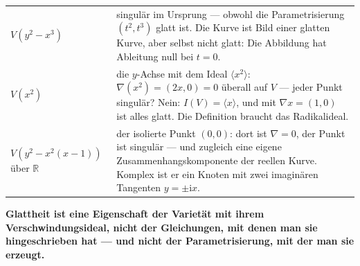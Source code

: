 \begin{warnung}
\begin{center}
{\small
\renewcommand{\arraystretch}{1.5}
\begin{tabular}{@{}P{3.2cm}P{5.6cm}@{}}
\toprule
$V(y^{2} - x^{3})$ & singulär im Ursprung --- obwohl die Parametrisierung $(t^{2}, t^{3})$ glatt ist. Die Kurve ist Bild einer glatten Kurve, aber selbst nicht glatt: Die Abbildung hat Ableitung null bei $t = 0$.\\
$V(x^{2})$ & die $y$-Achse mit dem Ideal $\langle x^{2}\rangle$: $\nabla(x^{2}) = (2x, 0) = 0$ überall auf $V$ --- jeder Punkt singulär? Nein: $I(V) = \langle x\rangle$, und mit $\nabla x = (1, 0)$ ist alles glatt. Die Definition braucht das Radikalideal.\\
$V(y^{2} - x^{2}(x - 1))$ über $\mathbb R$ & der isolierte Punkt $(0,0)$: dort ist $\nabla = 0$, der Punkt ist singulär --- und zugleich eine eigene Zusammenhangskomponente der reellen Kurve. Komplex ist er ein Knoten mit zwei imaginären Tangenten $y = \pm\mathrm ix$.\\
\bottomrule
\end{tabular}}
\end{center}

\begin{center}
\begin{minipage}{0.9\textwidth}
\textbf{Glattheit ist eine Eigenschaft der Varietät mit ihrem Verschwindungsideal, nicht der Gleichungen, mit denen man sie hingeschrieben hat --- und nicht der Parametrisierung, mit der man sie erzeugt.}
\end{minipage}
\end{center}

\begin{center}
\begin{minipage}{0.88\textwidth}
\end{minipage}
\end{center}
\end{warnung}

